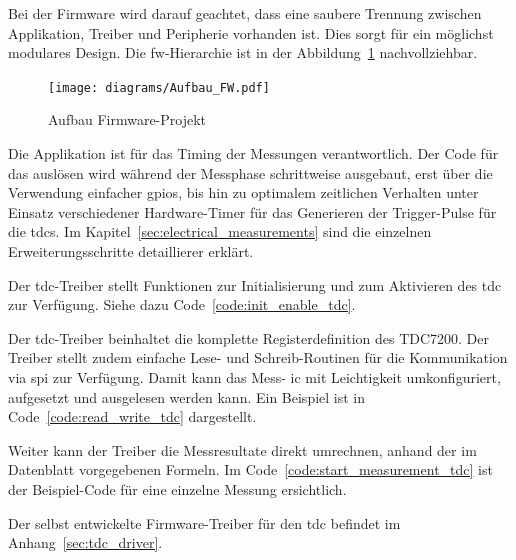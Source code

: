 Bei der Firmware wird darauf geachtet, dass eine saubere Trennung zwischen Applikation, Treiber und
Peripherie vorhanden ist. Dies sorgt für ein möglichst modulares Design. Die \acrshort{fw}-Hierarchie ist in der
Abbildung~\ref{fig:hierarchy_firmware} nachvollziehbar.

\begin{figure}[H]
    \centering
    \texttt{[image: diagrams/Aufbau\_FW.pdf]}
    \caption{Aufbau Firmware-Projekt}\label{fig:hierarchy_firmware}
\end{figure}

Die Applikation ist für das Timing der Messungen verantwortlich. Der Code für das auslösen wird während der Messphase schrittweise ausgebaut,
erst über die Verwendung einfacher \acrshort{gpio}s, bis hin zu optimalem zeitlichen Verhalten unter Einsatz verschiedener
Hardware-Timer für das Generieren der Trigger-Pulse für die \acrshort{tdc}s. Im Kapitel~\ref{sec:electrical_measurements}
sind die einzelnen Erweiterungsschritte detaillierer erklärt.

Der \acrshort{tdc}-Treiber stellt Funktionen zur Initialisierung und zum Aktivieren des \acrshort{tdc} zur Verfügung.
Siehe dazu Code~\ref{code:init_enable_tdc}.



Der \acrshort{tdc}-Treiber beinhaltet die komplette Registerdefinition des TDC7200. Der Treiber stellt zudem einfache
Lese- und Schreib-Routinen für die Kommunikation via \acrshort{spi} zur Verfügung. Damit kann das Mess- \acrshort{ic}
mit Leichtigkeit umkonfiguriert, aufgesetzt und ausgelesen werden kann. Ein Beispiel ist in
Code~\ref{code:read_write_tdc} dargestellt.



Weiter kann der Treiber die Messresultate direkt umrechnen, anhand der im Datenblatt vorgegebenen
Formeln. Im Code~\ref{code:start_measurement_tdc} ist der Beispiel-Code für eine einzelne Messung ersichtlich.



Der selbst entwickelte Firmware-Treiber für den \acrshort{tdc} befindet im Anhang~\ref{sec:tdc_driver}.

